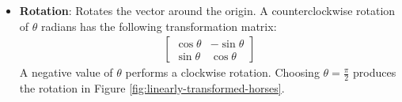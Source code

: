 \begin{itemize}
\item \textbf{Rotation}: %
Rotates the vector around the origin.
A counterclockwise rotation of $\theta$ radians has the following transformation matrix:
%
\begin{align*}
\left[\begin{array}{rr}
\cos\theta & -\sin\theta\\
\sin\theta &  \cos\theta
\end{array}\right]
\end{align*}
%
A negative value of $\theta$ performs a clockwise rotation.
Choosing $\theta = \frac{\pi}{2}$ produces the rotation in Figure \ref{fig:linearly-transformed-horses}.

\end{itemize}

